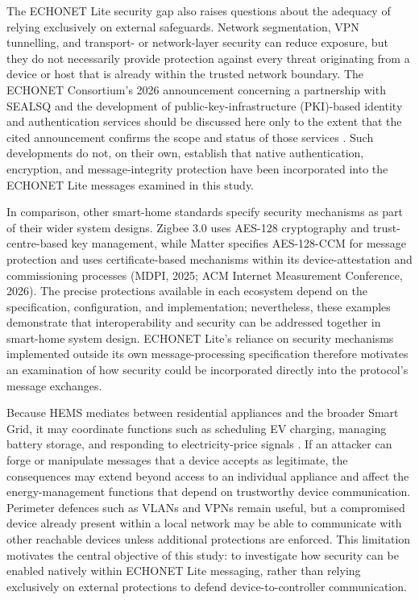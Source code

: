 The ECHONET Lite security gap also raises questions about the adequacy of relying exclusively on external safeguards. Network segmentation, VPN tunnelling, and transport- or network-layer security can reduce exposure, but they do not necessarily provide protection against every threat originating from a device or host that is already within the trusted network boundary. The ECHONET Consortium's 2026 announcement concerning a partnership with SEALSQ and the development of public-key-infrastructure (PKI)-based identity and authentication services should be discussed here only to the extent that the cited announcement confirms the scope and status of those services \citep{SEALSQ2026}. Such developments do not, on their own, establish that native authentication, encryption, and message-integrity protection have been incorporated into the ECHONET Lite messages examined in this study.

In comparison, other smart-home standards specify security mechanisms as part of their wider system designs. Zigbee 3.0 uses AES-128 cryptography and trust-centre-based key management, while Matter specifies AES-128-CCM for message protection and uses certificate-based mechanisms within its device-attestation and commissioning processes \citep{phamMatterECHONETLite2024,AlJanah2021}(MDPI, 2025; ACM Internet Measurement Conference, 2026). The precise protections available in each ecosystem depend on the specification, configuration, and implementation; nevertheless, these examples demonstrate that interoperability and security can be addressed together in smart-home system design. ECHONET Lite's reliance on security mechanisms implemented outside its own message-processing specification therefore motivates an examination of how security could be incorporated directly into the protocol's message exchanges.

Because HEMS mediates between residential appliances and the broader Smart Grid, it may coordinate functions such as scheduling EV charging, managing battery storage, and responding to electricity-price signals \citep{isshikiCaseStudyEcological2015,eissaDevelopingIncentiveDemand2019,hanHomeEnergyManagement2023,zafarHomeEnergyManagement2020}. If an attacker can forge or manipulate messages that a device accepts as legitimate, the consequences may extend beyond access to an individual appliance and affect the energy-management functions that depend on trustworthy device communication. Perimeter defences such as VLANs and VPNs remain useful, but a compromised device already present within a local network may be able to communicate with other reachable devices unless additional protections are enforced. This limitation motivates the central objective of this study: to investigate how security can be enabled natively within ECHONET Lite messaging, rather than relying exclusively on external protections to defend device-to-controller communication.




